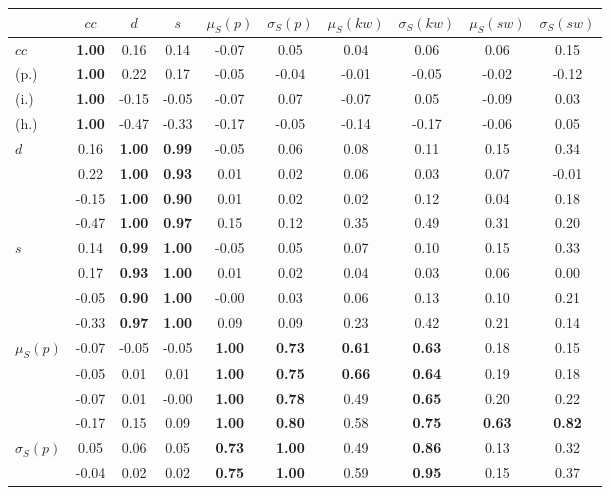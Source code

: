 \begin{table*}[h!]
\begin{center}
\begin{tabular}{| l || c | c | c | c | c | c | c | c | c |}\hline
 & $cc$ & $d$ & $s$ & $\mu_S(p)$ & $\sigma_S(p)$ & $\mu_S(kw)$ & $\sigma_S(kw)$ & $\mu_S(sw)$ & $\sigma_S(sw)$ \\\hline\hline
$cc$ & {\bf 1.00} & 0.16 & 0.14 & -0.07 & 0.05 & 0.04 & 0.06 & 0.06 & 0.15 \\
(p.) & {\bf 1.00} & 0.22 & 0.17 & -0.05 & -0.04 & -0.01 & -0.05 & -0.02 & -0.12 \\
(i.) & {\bf 1.00} & -0.15 & -0.05 & -0.07 & 0.07 & -0.07 & 0.05 & -0.09 & 0.03 \\
(h.) & {\bf 1.00} & -0.47 & -0.33 & -0.17 & -0.05 & -0.14 & -0.17 & -0.06 & 0.05 \\\hline
$d$ & 0.16 & {\bf 1.00} & {\bf 0.99} & -0.05 & 0.06 & 0.08 & 0.11 & 0.15 & 0.34 \\
 & 0.22 & {\bf 1.00} & {\bf 0.93} & 0.01 & 0.02 & 0.06 & 0.03 & 0.07 & -0.01 \\
 & -0.15 & {\bf 1.00} & {\bf 0.90} & 0.01 & 0.02 & 0.02 & 0.12 & 0.04 & 0.18 \\
 & -0.47 & {\bf 1.00} & {\bf 0.97} & 0.15 & 0.12 & 0.35 & 0.49 & 0.31 & 0.20 \\\hline
$s$ & 0.14 & {\bf 0.99} & {\bf 1.00} & -0.05 & 0.05 & 0.07 & 0.10 & 0.15 & 0.33 \\
 & 0.17 & {\bf 0.93} & {\bf 1.00} & 0.01 & 0.02 & 0.04 & 0.03 & 0.06 & 0.00 \\
 & -0.05 & {\bf 0.90} & {\bf 1.00} & -0.00 & 0.03 & 0.06 & 0.13 & 0.10 & 0.21 \\
 & -0.33 & {\bf 0.97} & {\bf 1.00} & 0.09 & 0.09 & 0.23 & 0.42 & 0.21 & 0.14 \\\hline
$\mu_S(p)$ & -0.07 & -0.05 & -0.05 & {\bf 1.00} & {\bf 0.73} & {\bf 0.61} & {\bf 0.63} & 0.18 & 0.15 \\
 & -0.05 & 0.01 & 0.01 & {\bf 1.00} & {\bf 0.75} & {\bf 0.66} & {\bf 0.64} & 0.19 & 0.18 \\
 & -0.07 & 0.01 & -0.00 & {\bf 1.00} & {\bf 0.78} & 0.49 & {\bf 0.65} & 0.20 & 0.22 \\
 & -0.17 & 0.15 & 0.09 & {\bf 1.00} & {\bf 0.80} & 0.58 & {\bf 0.75} & {\bf 0.63} & {\bf 0.82} \\\hline
$\sigma_S(p)$ & 0.05 & 0.06 & 0.05 & {\bf 0.73} & {\bf 1.00} & 0.49 & {\bf 0.86} & 0.13 & 0.32 \\
 & -0.04 & 0.02 & 0.02 & {\bf 0.75} & {\bf 1.00} & 0.59 & {\bf 0.95} & 0.15 & 0.37 \\

\end{tabular}
\end{center}
\end{table*}
